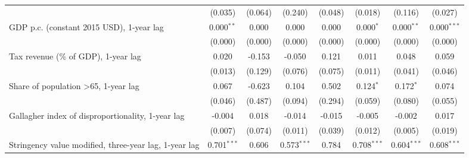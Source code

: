 \begin{table}[htbp]
\begin{tabular}{lccccccc}
                                                                                                  & (0.035)       & (0.064)                   & (0.240)        & (0.048)          & (0.018)         & (0.116)         & (0.027)\\   
      GDP p.c. (constant 2015 USD), 1-year lag                                                    & 0.000$^{**}$  & 0.000                     & 0.000          & 0.000            & 0.000$^{*}$     & 0.000$^{**}$    & 0.000$^{***}$\\   
                                                                                                  & (0.000)       & (0.000)                   & (0.000)        & (0.000)          & (0.000)         & (0.000)         & (0.000)\\   
      Tax revenue (\% of GDP), 1-year lag                                                         & 0.020         & -0.153                    & -0.050         & 0.121            & 0.011           & 0.048           & 0.059\\   
                                                                                                  & (0.013)       & (0.129)                   & (0.076)        & (0.075)          & (0.011)         & (0.041)         & (0.046)\\   
      Share of population >65, 1-year lag                                                         & 0.067         & -0.623                    & 0.104          & 0.502            & 0.124$^{*}$     & 0.172$^{*}$     & 0.074\\   
                                                                                                  & (0.046)       & (0.487)                   & (0.094)        & (0.294)          & (0.059)         & (0.080)         & (0.055)\\   
      Gallagher index of disproportionality, 1-year lag                                           & -0.004        & 0.018                     & -0.014         & -0.015           & -0.005          & -0.002          & 0.017\\   
                                                                                                  & (0.007)       & (0.074)                   & (0.011)        & (0.039)          & (0.012)         & (0.005)         & (0.019)\\   
      Stringency value modified, three-year lag, 1-year lag                                       & 0.701$^{***}$ & 0.606                     & 0.573$^{***}$  & 0.784            & 0.708$^{***}$   & 0.604$^{***}$   & 0.608$^{***}$\\   

\end{tabular}
\end{table}
